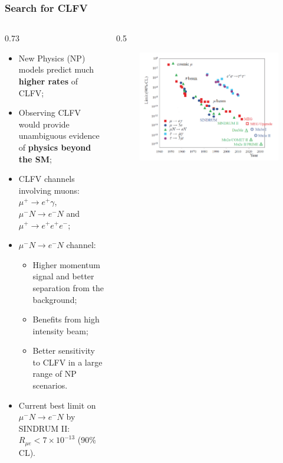 \documentclass{beamer}
\begin{document}
\begin{frame}
    \frametitle{Search for CLFV}
                \vspace{-2mm}
   \begin{columns}
    \begin{column}{0.73\framewidth}
        \begin{itemize}
            \item New Physics (NP) models predict much \textbf{higher rates} of CLFV;
            \vspace{1mm}
            \item Observing CLFV would provide unambiguous evidence of \textbf{physics beyond the SM};
            \vspace{1mm}
            \item CLFV channels involving muons: $\mu^+ \rightarrow e^+ \gamma$, $\mu^- N \rightarrow e^- N$ and $\mu^+ \rightarrow e^+ e^+ e^-$;
            \vspace{1mm}
            \item $\mu^- N \rightarrow e^- N$ channel:
            \begin{itemize}
                \item Higher momentum signal and better separation from the background;
                \item Benefits from high intensity beam;
                \item Better sensitivity to CLFV in a large range of NP scenarios.
            \end{itemize}
            \item Current best limit on $\mu^- N \rightarrow e^- N$ by SINDRUM II: $R_{\mu e} < 7 \times 10^{-13}$ (90\% CL).
        \end{itemize}
    \end{column}
    \begin{column}{0.5\framewidth}
        \begin{figure}[h]
            \centering
            \hspace*{-6ex}
            \includegraphics[width=\columnwidth]{figures/png/Screenshot_20240912_093047.png}

\end{figure}
\end{column}
\end{columns}
\end{frame}
\end{document}
